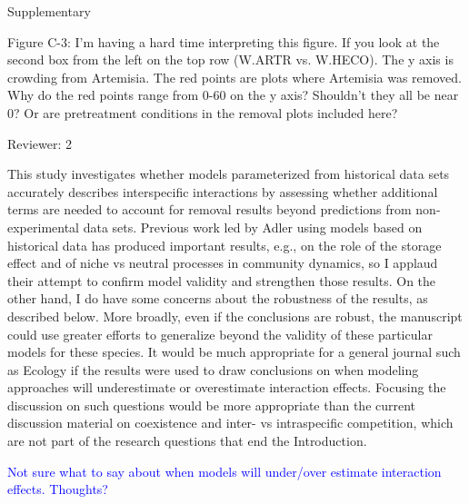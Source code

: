 \documentclass[12pt]{article}
\newcommand{\response}{\textcolor{blue}}
\begin{document}
{Supplementary

Figure C-3: I’m having a hard time interpreting this figure. If you look at the second box from the left on the top row (W.ARTR vs. W.HECO). The y axis is crowding from Artemisia. The red points are plots where Artemisia was removed. Why do the red points range from 0-60 on the y axis? Shouldn't they all be near 0? Or are pretreatment conditions in the removal plots included here? 


Reviewer: 2

This study investigates whether models parameterized from historical data sets accurately describes
interspecific interactions by assessing whether additional terms are needed to account for removal
results beyond predictions from non-experimental data sets. Previous work led by Adler using models
based on historical data has produced important results, e.g., on the role of the storage effect and of
niche vs neutral processes in community dynamics, so I applaud their attempt to confirm model validity
and strengthen those results. On the other hand, I do have some concerns about the robustness of the
results, as described below. More broadly, even if the conclusions are robust, the manuscript could use
greater efforts to generalize beyond the validity of these particular models for these species. It would
be much appropriate for a general journal such as Ecology if the results were used to draw conclusions
on when modeling approaches will underestimate or overestimate interaction effects. Focusing the
discussion on such questions would be more appropriate than the current discussion material on
coexistence and inter- vs intraspecific competition, which are not part of the research questions that
end the Introduction.

\response{Not sure what to say about when models will under/over estimate interaction effects. Thoughts?}

}
\end{document}
